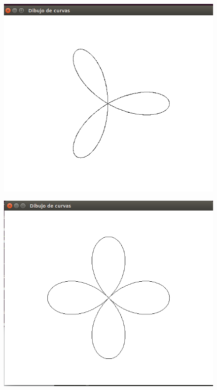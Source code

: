 \documentclass[a4paper,12pt]{article}
\begin{document}
\begin{enumerate}
\begin{figure}[H]
 \end{figure}
 \begin{figure}[H]
  \centering
  \includegraphics[scale = 0.3]{3.png}
 \end{figure}
 \begin{figure}[H]
  \centering
  \includegraphics[scale = 0.3]{4.png}
 \end{figure}
 \begin{figure}[H]

\end{figure}
\end{enumerate}
\end{document}
